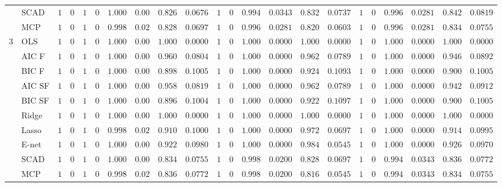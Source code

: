 \begin{tabular}{ll|ll|llllll|llllll|llllll}
 & SCAD  & $1$ & $0$ & $1$ & $0$ & $1.000$ & $0.00$ & $0.826$ & $0.0676$ & $1$ & $0$ & $0.994$ & $0.0343$ & $0.832$ & $0.0737$ & $1$ & $0$ & $0.996$ & $0.0281$ & $0.842$ & $0.0819$ \\
 & MCP  & $1$ & $0$ & $1$ & $0$ & $0.998$ & $0.02$ & $0.828$ & $0.0697$ & $1$ & $0$ & $0.996$ & $0.0281$ & $0.820$ & $0.0603$ & $1$ & $0$ & $0.996$ & $0.0281$ & $0.834$ & $0.0755$ \\\hline
3 & OLS  & $1$ & $0$ & $1$ & $0$ & $1.000$ & $0.00$ & $1.000$ & $0.0000$ & $1$ & $0$ & $1.000$ & $0.0000$ & $1.000$ & $0.0000$ & $1$ & $0$ & $1.000$ & $0.0000$ & $1.000$ & $0.0000$ \\
 & AIC F  & $1$ & $0$ & $1$ & $0$ & $1.000$ & $0.00$ & $0.960$ & $0.0804$ & $1$ & $0$ & $1.000$ & $0.0000$ & $0.962$ & $0.0789$ & $1$ & $0$ & $1.000$ & $0.0000$ & $0.946$ & $0.0892$ \\
 & BIC F  & $1$ & $0$ & $1$ & $0$ & $1.000$ & $0.00$ & $0.898$ & $0.1005$ & $1$ & $0$ & $1.000$ & $0.0000$ & $0.924$ & $0.1093$ & $1$ & $0$ & $1.000$ & $0.0000$ & $0.900$ & $0.1005$ \\
 & AIC SF  & $1$ & $0$ & $1$ & $0$ & $1.000$ & $0.00$ & $0.958$ & $0.0819$ & $1$ & $0$ & $1.000$ & $0.0000$ & $0.962$ & $0.0789$ & $1$ & $0$ & $1.000$ & $0.0000$ & $0.942$ & $0.0912$ \\
 & BIC SF  & $1$ & $0$ & $1$ & $0$ & $1.000$ & $0.00$ & $0.896$ & $0.1004$ & $1$ & $0$ & $1.000$ & $0.0000$ & $0.922$ & $0.1097$ & $1$ & $0$ & $1.000$ & $0.0000$ & $0.900$ & $0.1005$ \\
 & Ridge  & $1$ & $0$ & $1$ & $0$ & $1.000$ & $0.00$ & $1.000$ & $0.0000$ & $1$ & $0$ & $1.000$ & $0.0000$ & $1.000$ & $0.0000$ & $1$ & $0$ & $1.000$ & $0.0000$ & $1.000$ & $0.0000$ \\
 & Lasso  & $1$ & $0$ & $1$ & $0$ & $0.998$ & $0.02$ & $0.910$ & $0.1000$ & $1$ & $0$ & $1.000$ & $0.0000$ & $0.972$ & $0.0697$ & $1$ & $0$ & $1.000$ & $0.0000$ & $0.914$ & $0.0995$ \\
 & E-net  & $1$ & $0$ & $1$ & $0$ & $1.000$ & $0.00$ & $0.922$ & $0.0980$ & $1$ & $0$ & $1.000$ & $0.0000$ & $0.984$ & $0.0545$ & $1$ & $0$ & $1.000$ & $0.0000$ & $0.926$ & $0.0970$ \\
 & SCAD  & $1$ & $0$ & $1$ & $0$ & $1.000$ & $0.00$ & $0.834$ & $0.0755$ & $1$ & $0$ & $0.998$ & $0.0200$ & $0.828$ & $0.0697$ & $1$ & $0$ & $0.994$ & $0.0343$ & $0.836$ & $0.0772$ \\
 & MCP  & $1$ & $0$ & $1$ & $0$ & $0.998$ & $0.02$ & $0.836$ & $0.0772$ & $1$ & $0$ & $0.998$ & $0.0200$ & $0.816$ & $0.0545$ & $1$ & $0$ & $0.994$ & $0.0343$ & $0.834$ & $0.0755$ \\\hline

\end{tabular}
